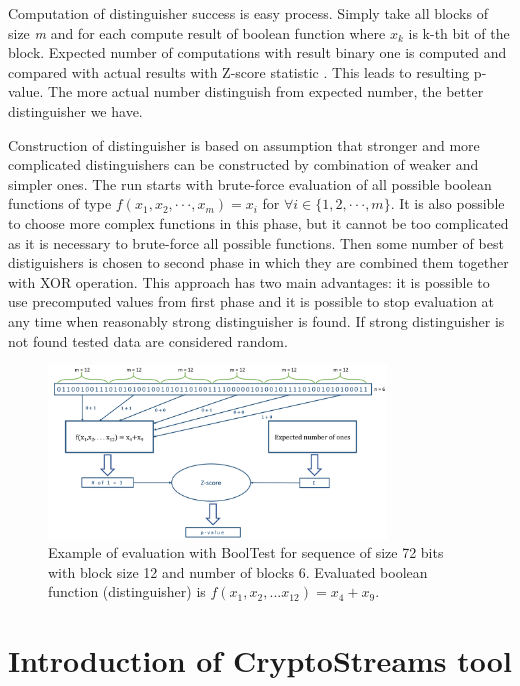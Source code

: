 \documentclass[
    digital,    %
    oneside,    %
    color,
    11pt,
    nocover,
    notable,
    nolof,
    nolot,
    final
]{fithesis3}
\begin{document}
Computation of distinguisher success is easy process. Simply take all blocks of size \textit{m} and for each compute result of boolean function where $x_{k}$ is k-th bit of the block.
Expected number of computations with result binary one is computed and compared with actual results with Z-score statistic \cite{sheskin2003handbook}. This leads to resulting p-value. The more actual number distinguish from expected number, the better distinguisher we have.

Construction of distinguisher is based on assumption that stronger and more complicated distinguishers can be constructed by combination of weaker and simpler ones. The run starts with brute-force evaluation of all possible boolean functions of type  $f(x_{1}, x_{2}, \cdot \cdot \cdot, x_{m}) = x_{i}$ for $\forall i \in \{1, 2, \cdot \cdot \cdot, m\}$. It is also possible to choose more complex functions in this phase, but it cannot be too complicated as it is necessary to brute-force all possible functions. Then some number of best distiguishers is chosen to second phase in which they are combined them together with XOR operation. This approach has two main advantages: it is possible to use precomputed values from first phase and it is possible to stop evaluation at any time when reasonably strong distinguisher is found. If strong distinguisher is not found tested data are considered random. \cite{booltest-secrypt2017}

\begin{figure}[h]
	\centering
	\includegraphics[width=0.8\textwidth]{./images/pictures/bool-test.png}
	\caption{Example of evaluation with BoolTest for sequence of size 72 bits with block size 12 and number of blocks 6. Evaluated boolean function (distinguisher) is $f(x_1,x_2, . . . x_{12}) = x_4+x_9$.}
	\label{fig:bool-test}
\end{figure}


\chapter{Introduction of CryptoStreams tool}
\label{chap:cryptostreams}
\end{document}
